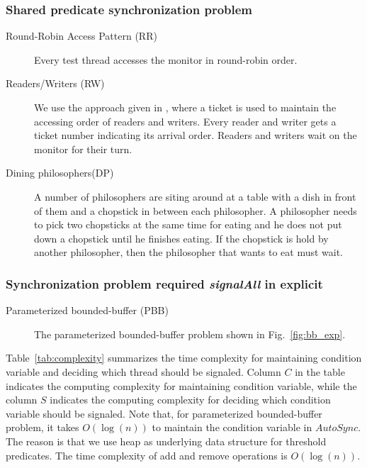 \documentclass[preprint]{sigplanconf}
\begin{document}
\subsubsection{Shared predicate synchronization problem}
\begin{description}
    \item[Round-Robin Access Pattern (RR)] Every test thread accesses the
        monitor in round-robin order. 
    \item[Readers/Writers (RW) \cite{chp71}] 
    We use the approach given in \cite{bh05}, where a ticket is used
        to maintain the accessing order of readers and writers. Every reader
        and writer gets a ticket number indicating its arrival order. Readers
        and writers wait on the monitor for their turn. 
    \item [Dining philosophers(DP) \cite{dijk71}] A number of philosophers are 
        siting around at a table with a dish in front of them and a chopstick 
        in between each philosopher. A philosopher needs to pick two chopsticks at the
        same time for eating and he does not put down a chopstick until he finishes 
        eating. If the chopstick is hold by another philosopher, then the philosopher 
        that wants to eat must wait.
\end{description}
\subsubsection{Synchronization problem required {\em signalAll} in explicit }
\begin{description}
    \item[Parameterized bounded-buffer (PBB)  \cite{dijk65, dijk71}] The 
        parameterized bounded-buffer problem shown in Fig.~\ref{fig:bb_exp}. 
\end{description}

Table~\ref{tab:complexity} summarizes the time complexity for maintaining 
condition variable and deciding which thread should be signaled. Column $C$ in
the table 
indicates the computing complexity for maintaining condition variable, while 
the column $S$ indicates the computing complexity for deciding which condition 
variable should be signaled. Note that, for parameterized bounded-buffer 
problem, it takes $O(\log(n))$ to maintain the condition variable in 
$AutoSync$. The reason 
is that we use heap as underlying data structure for threshold predicates. The 
time complexity of add and remove operations is $O(\log(n))$.
\end{document}
